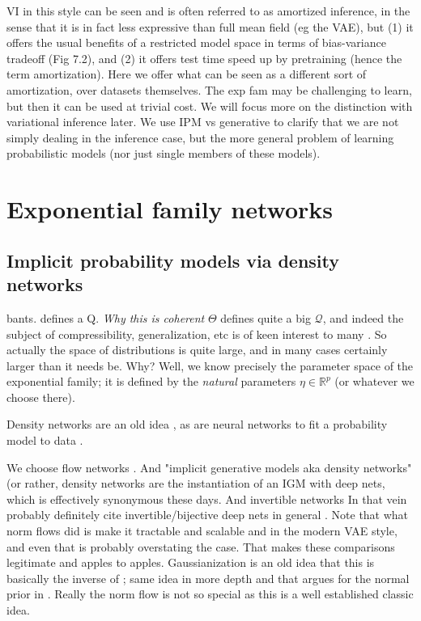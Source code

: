 \documentclass{article}
\begin{document}
VI in this style can be seen and is often referred to as amortized inference, in the sense that it is in fact less expressive than full mean field (eg the VAE), but (1) it offers the usual benefits of a restricted model space in terms of bias-variance tradeoff \cite{friedman2001elements} (Fig 7.2), and (2) it offers test time speed up by pretraining (hence the term amortization).  Here we offer what can be seen as a different sort of amortization, over datasets themselves.   The exp fam may be challenging to learn, but then it can be used at trivial cost.  We will focus more on the distinction with variational inference later.    We use IPM vs generative to clarify that we are not simply dealing in the inference case, but the more general problem of learning probabilistic models (nor just single members of these models).


  
 \section{Exponential family networks}
 
 \subsection{Implicit probability models via density networks}

bants.  defines a Q.
 \emph{Why this is coherent}
 $\Theta$ defines quite a big $\mathcal{Q}$, and indeed the subject of compressibility, generalization, etc is of keen interest to many \cite{zhou2018compressibility}.  So actually the space of distributions is quite large, and in many cases certainly larger than it needs be.  Why?  Well, we know precisely the parameter space of the exponential family; it is defined by the \emph{natural} parameters $\eta \in \mathbb{R}^p$ (or whatever we choose there).

 
Density networks are an old idea \cite{mackay1997density}, as are neural networks to fit a probability model to data \cite{dayan1995helmholtz,hinton1995wake}.

 We choose flow networks  \cite{rezende2015variational}.  And "implicit generative models aka density networks" (or rather, density networks are the instantiation of an IGM with deep nets, which is effectively synonymous these days.   And invertible networks  In that vein probably definitely cite invertible/bijective deep nets in general \cite{baird2005one, rippel2013high, uria2013rnade, rezende2015variational, dinh2016density, papamakarios2017masked, jacobsen2018revnet}.  Note that what norm flows  \cite{rezende2015variational} did is make it tractable and scalable and in the modern VAE style, and even that is probably overstating the case.  That makes these comparisons legitimate and apples to apples.   Gaussianization is an old idea that this is basically the inverse of \cite{chen2001gaussianization}; same idea in more depth and that argues for the normal prior in \cite{tabak2010density}.  Really the norm flow is not so special as this is a well established classic idea.    
 
\end{document}
